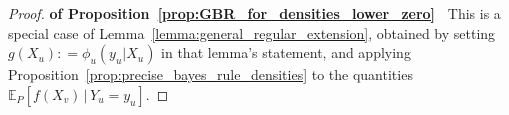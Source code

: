 \documentclass[twoside,11pt]{article}
\newcommand{\reals}{\mathbb{R}}
\newcommand{\processes}{\mathbb{P}}
\newcommand{\wprocesses}{\processes^{\mathrm{W}}}
\newcommand{\lexp}{\underline{\mathbb{E}}_{\rateset,\mathcal{M}}^\mathrm{W}}
\newcommand{\rateset}{\mathcal{Q}}
\newcommand{\coloneqq}{:\!=}
\begin{document}
\begin{proof}{\bf of Proposition~\ref{prop:GBR_for_densities_lower_zero}~}
This is a special case of Lemma~\ref{lemma:general_regular_extension}, obtained by setting $g(X_u)\coloneqq \phi_u(y_u\vert X_u)$ in that lemma's statement, and applying Proposition~\ref{prop:precise_bayes_rule_densities} to the quantities $\mathbb{E}_P[f(X_v)\,\vert\,Y_u=y_u]$.
\end{proof}

%
%
%
\end{document}
